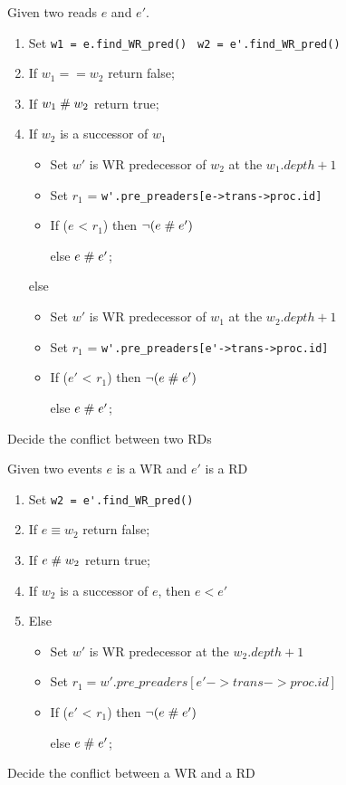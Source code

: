 \documentclass{llncs}
\begin{document}
\begin{algorithm}
	Given two reads $e$ and $e'$.
	\begin{enumerate}
		\item
		Set \verb!w1 = e.find_WR_pred() !
		\verb!w2 = e'.find_WR_pred()!
		\item
		If $w_1 == w_2$
		return false;
		\item
		If $w_1 \mathrel{\#} w_2$
		return true;
		\item
		If $w_2$ is a successor of $w_1$
		\begin{itemize}
			\item
			Set $w'$ is WR predecessor of $w_2$ at the $w_1.depth + 1$
			\item
			Set $r_1$ = \verb!w'.pre_preaders[e->trans->proc.id]!
			\item
			If ($e$ < $r_1$) then $\lnot (e \mathrel{\#} e')$
			
			else 	$e \mathrel{\#} e'$;
		\end{itemize}
		else
		\begin{itemize}
			\item
			Set $w'$ is WR predecessor of $w_1$ at the $w_2.depth + 1$
			\item
			Set $r_1$ = \verb!w'.pre_preaders[e'->trans->proc.id]!
			\item
			If ($e'$ < $r_1$) then $\lnot (e \mathrel{\#} e')$
			
			else 	$e \mathrel{\#} e'$;
		\end{itemize}
		
	\end{enumerate}
	\caption{Decide the conflict between two RDs}
	\label{a:rds}	
\end{algorithm}

\begin{algorithm}
	Given two events $e$ is a WR and $e'$ is a RD
	\begin{enumerate}
	\item
		Set 	\verb!w2 = e'.find_WR_pred()!
	\item
		If $e \equiv w_2$
		return false;
	\item
		If $e \mathrel{\#} w_2$
		return true;
	\item
		If $w_2$ is a successor of $e$, then $e < e'$
	\item
		Else
		\begin{itemize}
			\item
			Set $w'$ is WR predecessor at the $w_2.depth + 1$
			\item
			Set $r_1 = w'.pre\_preaders[e'->trans->proc.id]$
			\item
			If ($e'$ < $r_1$) then $\lnot (e \mathrel{\#} e')$
			
			else 	$e \mathrel{\#} e'$;
		\end{itemize}
		
	\end{enumerate}
	\caption{Decide the conflict between a WR and a RD}
	\label{a:wrd}	
\end{algorithm}
\end{document}
